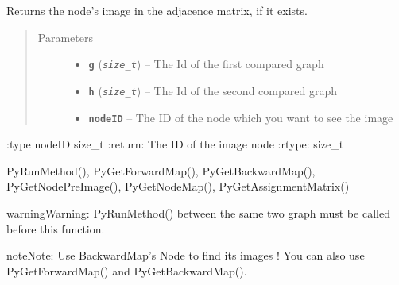 \documentclass[letterpaper,10pt,english]{sphinxmanual}
\begin{document}
\begin{fulllineitems}
\label{doc:PythonGedLib.PyGetNodeImage}
Returns the node's image in the adjacence matrix, if it exists.
\begin{quote}\begin{description}
\item[{Parameters}] \leavevmode\begin{itemize}
\item {} 
\textbf{\texttt{g}} (\emph{\texttt{size\_t}}) -- The Id of the first compared graph

\item {} 
\textbf{\texttt{h}} (\emph{\texttt{size\_t}}) -- The Id of the second compared graph

\item {} 
\textbf{\texttt{nodeID}} -- The ID of the node which you want to see the image

\end{itemize}

\end{description}\end{quote}

:type nodeID size\_t
:return: The ID of the image node
:rtype: size\_t




PyRunMethod(), PyGetForwardMap(), PyGetBackwardMap(), PyGetNodePreImage(), PyGetNodeMap(), PyGetAssignmentMatrix()



\begin{notice}{warning}{Warning:}
PyRunMethod() between the same two graph must be called before this function.
\end{notice}

\begin{notice}{note}{Note:}
Use BackwardMap's Node to find its images ! You can also use PyGetForwardMap() and PyGetBackwardMap().
\end{notice}

\end{fulllineitems}

\end{document}
